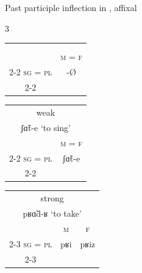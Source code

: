 \documentclass[output=paper,colorlinks,citecolor=brown]{langscibook}
\begin{document}
\noindent\begin{minipage}{\textwidth}
	\begin{exe}
		\ex \label{04ex11}
		Past participle inflection in , affixal
		
		\hspace*{-2.5em}
		\begin{minipage}{\dimexpr\textwidth}
			\setlength{\columnsep}{-5pt}
			\begin{multicols}{3}
				\begin{xlist}
					\ex \label{04ex11a}
					\begin{tabularx}{\linewidth}{cc}
						\multicolumn{2}{c}{\phantom{text}} \\
						\multicolumn{2}{c}{\phantom{texttext}} \\
						& \textsc{m} = \textsc{f} \\
						\cline{2-2}
						\textsc{sg} = \textsc{pl} & \multicolumn{1}{|c|}{-Ø} \\
						\cline{2-2}
					\end{tabularx}
					
					\ex \label{04ex11b}
					\begin{tabularx}{\linewidth}{cc}
						\multicolumn{2}{c}{weak} \\
						\multicolumn{2}{c}{ʃɑ̃t-e ‘to sing’} \\
						& \textsc{m} = \textsc{f} \\
						\cline{2-2}
						\textsc{sg} = \textsc{pl} & \multicolumn{1}{|c|}{ʃɑ̃t-e} \\
						\cline{2-2}
					\end{tabularx}
					
					\ex \label{04ex11c}
					\begin{tabularx}{\linewidth}{ccc}
						\multicolumn{3}{c}{strong} \\
						\multicolumn{3}{c}{pʁɑ̃d-ʁ ‘to take’} \\
						& \textsc{m} & \textsc{f} \\
						\cline{2-3}
						\textsc{sg} = \textsc{pl} & \multicolumn{1}{|c|}{pʁi} & \multicolumn{1}{c|}{pʁiz} \\
						\cline{2-3}
					\end{tabularx}
				\end{xlist}
			\end{multicols}
		\end{minipage}
	\end{exe}
\end{minipage}
\end{document}
